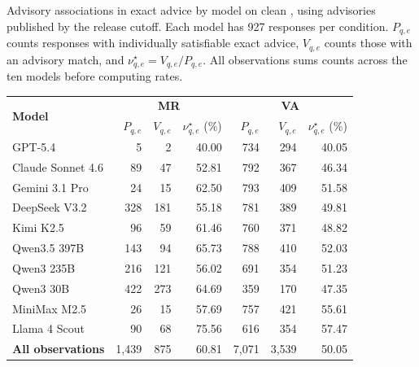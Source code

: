 \begin{tableorg}[!htbp]
\centering\small
\renewcommand{\tablecaptionfont}{\fontsize{9}{11}\selectfont}
\caption{Advisory associations in exact advice by model on clean \myso, using advisories published by the release cutoff.
Each model has 927 responses per condition.
$P_{q,e}$ counts responses with individually satisfiable exact advice, $V_{q,e}$ counts those with an advisory match, and $\nu^\star_{q,e}=V_{q,e}/P_{q,e}$.
All observations sums counts across the ten models before computing rates.}
\label{tab:rq2_security}
\setlength{\tabcolsep}{4pt}
\renewcommand{\arraystretch}{1.12}
\begin{tabular}{@{}lrrrrrr@{}}
\toprule
\multirow{2}{*}{\textbf{Model}} & \multicolumn{3}{c}{\textbf{MR}} & \multicolumn{3}{c}{\textbf{VA}} \\
\cmidrule(lr){2-4}\cmidrule(lr){5-7}
& $P_{q,e}$ & $V_{q,e}$ & $\nu^\star_{q,e}$ (\%) & $P_{q,e}$ & $V_{q,e}$ & $\nu^\star_{q,e}$ (\%) \\
\midrule
GPT-5.4 & 5 & 2 & 40.00 & 734 & 294 & 40.05 \\
Claude Sonnet 4.6 & 89 & 47 & 52.81 & 792 & 367 & 46.34 \\
Gemini 3.1 Pro & 24 & 15 & 62.50 & 793 & 409 & 51.58 \\
DeepSeek V3.2 & 328 & 181 & 55.18 & 781 & 389 & 49.81 \\
Kimi K2.5 & 96 & 59 & 61.46 & 760 & 371 & 48.82 \\
Qwen3.5 397B & 143 & 94 & 65.73 & 788 & 410 & 52.03 \\
Qwen3 235B & 216 & 121 & 56.02 & 691 & 354 & 51.23 \\
Qwen3 30B & 422 & 273 & 64.69 & 359 & 170 & 47.35 \\
MiniMax M2.5 & 26 & 15 & 57.69 & 757 & 421 & 55.61 \\
Llama 4 Scout & 90 & 68 & 75.56 & 616 & 354 & 57.47 \\
\midrule
\textbf{All observations} & 1,439 & 875 & 60.81 & 7,071 & 3,539 & 50.05 \\
\bottomrule
\end{tabular}
\end{tableorg}
